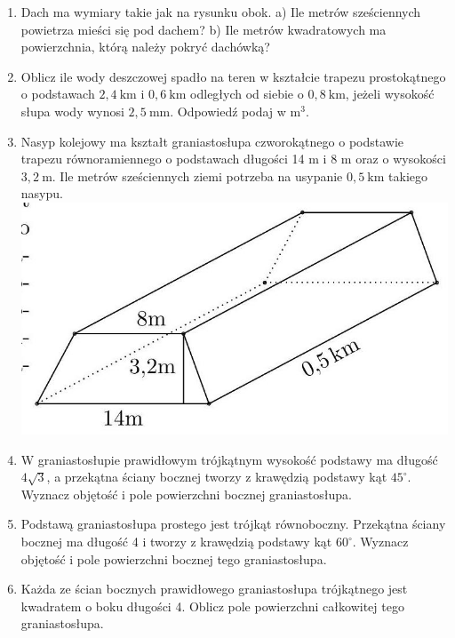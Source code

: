 \documentclass[10pt]{article}
\begin{document}
\begin{enumerate}
  \item Dach ma wymiary takie jak na rysunku obok. a) Ile metrów sześciennych powietrza mieści się pod dachem? b) Ile metrów kwadratowych ma powierzchnia, którą należy pokryć dachówką?
  \item Oblicz ile wody deszczowej spadło na teren w kształcie trapezu prostokątnego o podstawach \(2,4 \mathrm{~km}\) i \(0,6 \mathrm{~km}\) odległych od siebie o \(0,8 \mathrm{~km}\), jeżeli wysokość słupa wody wynosi \(2,5 \mathrm{~mm}\). Odpowiedź podaj w \(\mathrm{m}^{3}\).
  \item Nasyp kolejowy ma kształt graniastosłupa czworokątnego o podstawie trapezu równoramiennego o podstawach długości 14 m i 8 m oraz o wysokości \(3,2 \mathrm{~m}\). Ile metrów sześciennych ziemi potrzeba na usypanie \(0,5 \mathrm{~km}\) takiego nasypu.\\
\includegraphics[max width=\textwidth, center]{2024_11_21_e9b4faa005d5be2cc318g-080}
  \item W graniastosłupie prawidłowym trójkątnym wysokość podstawy ma długość \(4 \sqrt{3}\), a przekątna ściany bocznej tworzy z krawędzią podstawy kąt \(45^{\circ}\). Wyznacz objętość i pole powierzchni bocznej graniastosłupa.
  \item Podstawą graniastosłupa prostego jest trójkąt równoboczny. Przekątna ściany bocznej ma długość 4 i tworzy z krawędzią podstawy kąt \(60^{\circ}\). Wyznacz objętość i pole powierzchni bocznej tego graniastosłupa.
  \item Każda ze ścian bocznych prawidłowego graniastosłupa trójkątnego jest kwadratem o boku długości 4. Oblicz pole powierzchni całkowitej tego graniastosłupa.\\

\end{enumerate}
\end{document}
